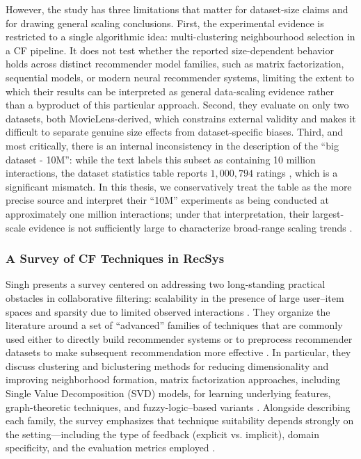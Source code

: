 \documentclass[12pt,a4paper]{article}
\begin{document}
However, the study has three limitations that matter for dataset-size claims and for drawing general scaling conclusions. First, the experimental evidence is restricted to a single algorithmic idea: multi-clustering neighbourhood selection in a CF pipeline. It does not test whether the reported size-dependent behavior holds across distinct recommender model families, such as matrix factorization, sequential models, or modern neural recommender systems, limiting the extent to which their results can be interpreted as general data-scaling evidence rather than a byproduct of this particular approach. Second, they evaluate on only two datasets, both MovieLens-derived, which constrains external validity and makes it difficult to separate genuine size effects from dataset-specific biases. Third, and most critically, there is an internal inconsistency in the description of the ``big dataset - 10M'': while the text labels this subset as containing 10 million interactions, the dataset statistics table reports $1,000,794$ ratings \cite{kuzelewska2020}, which is a significant mismatch. In this thesis, we conservatively treat the table as the more precise source and interpret their ``10M'' experiments as being conducted at approximately one million interactions; under that interpretation, their largest-scale evidence is not sufficiently large to characterize broad-range scaling trends \cite{kuzelewska2020}.

\subsubsection{A Survey of CF Techniques in RecSys}
Singh presents a survey centered on addressing two long-standing practical obstacles in collaborative filtering: scalability in the presence of large user--item spaces and sparsity due to limited observed interactions \cite{singh2020}. They organize the literature around a set of ``advanced'' families of techniques that are commonly used either to directly build recommender systems or to preprocess recommender datasets to make subsequent recommendation more effective \cite{singh2020}. In particular, they discuss clustering and biclustering methods for reducing dimensionality and improving neighborhood formation, matrix factorization approaches, including Single Value Decomposition (SVD) models, for learning underlying features, graph-theoretic techniques, and fuzzy-logic--based variants \cite{singh2020}. Alongside describing each family, the survey emphasizes that technique suitability depends strongly on the setting---including the type of feedback (explicit vs. implicit), domain specificity, and the evaluation metrics employed \cite{singh2020}.
\end{document}
